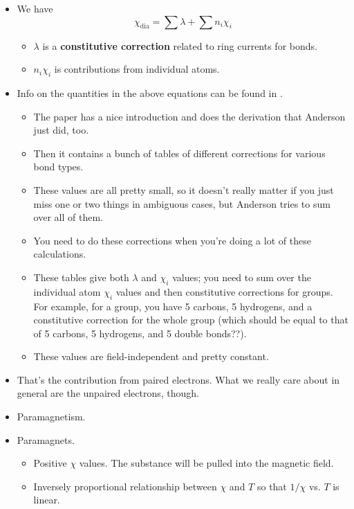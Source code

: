 \documentclass[../notes.tex]{subfiles}
\begin{document}
\begin{itemize}
    \item We have
    \begin{equation*}
        \chi_\text{dia} = \sum\lambda+\sum n_i\chi_i
    \end{equation*}
    \begin{itemize}
        \item $\lambda$ is a \textbf{constitutive correction} related to ring currents for bonds.
        \item $n_i\chi_i$ is contributions from individual atoms.
    \end{itemize}
    \item Info on the quantities in the above equations can be found in \textcite{bib:BerryDiamagnetism}.
    \begin{itemize}
        \item The paper has a nice introduction and does the derivation that Anderson just did, too.
        \item Then it contains a bunch of tables of different corrections for various bond types.
        \item These values are all pretty small, so it doesn't really matter if you just miss one or two things in ambiguous cases, but Anderson tries to sum over all of them.
        \item You need to do these corrections when you're doing a lot of these calculations.
        \item These tables give both $\lambda$ and $\chi_i$ values; you need to sum over the individual atom $\chi_i$ values and then constitutive corrections for groups. For example, for a  group, you have 5 carbons, 5 hydrogens, and a constitutive correction for the whole group (which should be equal to that of 5 carbons, 5 hydrogens, and 5  double bonds??).
        \item These values are field-independent and pretty constant.
    \end{itemize}
    \item That's the contribution from paired electrons. What we really care about in general are the unpaired electrons, though.
    \item Paramagnetism.
    \item Paramagnets.
    \begin{itemize}
        \item Positive $\chi$ values. The substance will be pulled into the magnetic field.
        \item Inversely proportional relationship between $\chi$ and $T$ so that $1/\chi$ vs. $T$ is linear.

\end{itemize}
\end{itemize}
\end{document}
